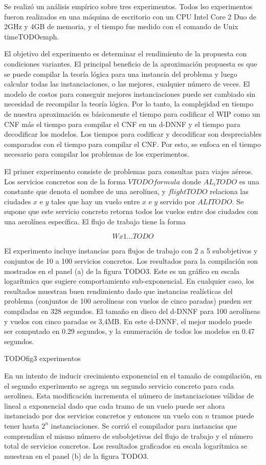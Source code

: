 \documentclass{article}
\begin{document}
Se realizó un análisis empírico sobre tres experimentos. Todos lso experimentos
fueron realizados en una máquina de escritorio con un CPU Intel Core 2 Duo de
2GHz y 4GB de memoria, y el tiempo fue medido con el comando de Unix
timeTODOemph.

El objetivo del experimento es determinar el rendimiento de la propuesta con
condiciones variantes. El principal beneficio de la aproximación propuesta es
que se puede compilar la teoría lógica para una instancia del problema y luego
calcular todas las instanciaciones, o las mejores, cualquier número de veces. El
modelo de costos para conseguir mejores instanciaciones puede ser cambiado sin
necesidad de recompilar la teoría lógica. Por lo tanto, la complejidad en tiempo
de nuestra aproximación es básicamente el tiempo para codificar el WIP como un
CNF más el tiempo para compilar el CNF en un d-DNNF y el tiempo para decodificar
los modelos. Los tiempos para codificar y decodificar son despreciables
comparados con el tiempo para compilar el CNF. Por esto, se enfoca en el tiempo
necesario para compilar los problemas de los experimentos.

El primer experimento consiste de problemas para consultas para viajes aéreos.
Los servicios concretos son de la forma $VTODO formula$ donde $AL_iTODO$ es una
constante que denota el nombre de una aerolínea, y $flightTODO$ relaciona las
ciudades $x$ e $y$ tales que hay un vuelo entre $x$ e $y$ servido por $ALITODO$.
Se supone que este servicio concreto retorna todos los vuelos entre dos ciudades
con una aerolínea específica. El flujo de trabajo tiene la forma

$$
Wx1...TODO
$$

El experimento incluye instancias para flujos de trabajo con 2 a 5 subobjetivos
y conjuntos de 10 a 100 servicios concretos. Los resultados para la compilación
son mostrados en el panel (a) de la figura TODO3. Este es un gráfico en escala
logarítmica que sugiere comportamiento sub-exponencial. En cualquier caso, los
resultados muestran buen rendimiento dado que instancias realísticas del
problema (conjuntos de 100 aerolíneas con vuelos de cinco paradas) pueden ser
compiladas en 328 segundos. El tamaño en disco del d-DNNF para 100 aerolíneas y
vuelos con cinco paradas es 3,4MB. En este d-DNNF, el mejor modelo puede ser
computado en 0.29 segundos, y la enumeración de todos los modelos en 0.47
segundos.

TODOfig3 experimentos

En un intento de inducir crecimiento exponencial en el tamaño de compilación, en
el segundo experimento se agrega un segundo servicio concreto para cada
aerolínea. Esta modificación incrementa el número de instanciaciones válidas de
lineal a exponencial dado que cada tramo de un vuelo puede ser ahora instanciado
por dos servicios concretos y entonces un vuelo con $n$ tramos puede tener hasta
$2^n$ instanciaciones. Se corrió el compilador para instancias que comprendían
el mismo número de subobjetivos del flujo de trabajo y el número total de
servicios concretos. Los resultados graficados en escala logarítmica se muestran
en el panel (b) de la figura TODO3.
\end{document}
